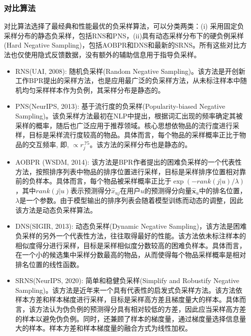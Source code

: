 \subsubsection{对比算法}
对比算法选择了最经典和性能最优的负采样算法，可以分类两类：(i) 采用固定负采样分布的静态负采样，包括RNS\cite{Steffen:2009:UAI,Xiangnan:2020:SIGIR,Weike:2013:IJCAI,Yu:2018:CIKM,Wang:2019:SIGIR,Xuejiao:2020:ASC}和PNS\cite{Mikolov:2013:NIPS,Chen:2017:KDD,Tang:2015:WWW}，(ii)具有动态采样分布下的硬负例采样(Hard Negative Sampling)，包括AOBPR\cite{Steffen:2014:WSDM}和DNS\cite{Zhang:2013:SIGIR}和最新的SRNS\cite{Ding:2020:NIPS}。所有这些对比方法也仅使用隐式反馈数据，没有额外的辅助信息用于指导负采样。
\begin{itemize}
	\item RNS(UAI, 2008)\cite{Steffen:2009:UAI,Xiangnan:2020:SIGIR,Weike:2013:IJCAI,Yu:2018:CIKM,Wang:2019:SIGIR,Xuejiao:2020:ASC}: 随机负采样(Random Negative Sampling)。该方法是开创新工作BPR提出的采样方法，也是应用最广泛的负采样方法，从未标注样本中随机均匀采样样本作为负例，其采样分布是静态的。
	\item PNS\cite{Mikolov:2013:NIPS,Chen:2017:KDD,Tang:2015:WWW}(NeurIPS, 2013): 基于流行度的负采样(Popularity-biased Negative Sampling)。该负采样方法最初在NLP中提出，根据词汇出现的频率确定其被采样的概率，随后也广泛应用于推荐领域。核心思想依物品的流行度进行采样，目标是采样流行度较高的物品。具体而言，每个物品的采样概率正比于物品的交互频率, 即, $\propto r_j ^{.75}$。该方法的采样分布也是静态的。
	\item AOBPR \cite{Steffen:2014:WSDM}(WSDM, 2014): 该方法是BPR作者提出的困难负采样的一个代表性方法，按照排序列表中物品的排序位置进行采样，目标是采样排序位置相对靠前的负样本。具体而言，每个物品被采样概率正比于$ \exp(-rank(j|u)/\lambda)$，其中$rank(j|u)$表示预测得分$\hat{x}_{uj}$在用户$u$的预测得分向量$\hat{\mathbf{x}}_u$中的排名位置，$\lambda$是一个参数。由于模型输出的排序列表会随着模型训练而动态的调整，因此该方法是动态负采样算法。
	\item{DNS}\cite{Zhang:2013:SIGIR}(SIGIR, 2013): 动态负采样(Dynamic Negative Sampling)，该方法是困难负采样的另外一个代表性方法，往往取得最好的性能。该方法依未标注样本的相似度得分进行采样，目标是采样相似度分数较高的困难负样本。具体而言，在一个小的候选集中采样分数最高的物品，从而使得每个物品采样概率是相对排名位置的线性函数。
	\item{SRNS}\cite{Ding:2020:NIPS}(NeurIPS, 2020): 简单和稳健负采样(Simplify and Robustify Negative Sampling)。该方法是近年来一个具有代表性的启发式负采样方法。该方法依样本方差和样本梯度进行采样，目标是采样高方差且梯度量大的样本。具体而言，该方法认为伪负例的预测得分具有相对较低的方差，因此应当采样高方差的样本以避免伪负例。同时，还兼顾了样本的梯度量，通过梯度量选择信息量大的样本。样本方差和样本梯度量的融合方式为线性加权。
\end{itemize}

